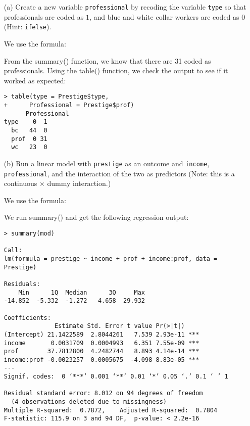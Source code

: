 \documentclass[12pt,letterpaper]{article}
\begin{document}
\newpage
\begin{enumerate}
	
	\item [(a)]
	Create a new variable \texttt{professional} by recoding the variable \texttt{type} so that professionals are coded as $1$, and blue and white collar workers are coded as $0$ (Hint: \texttt{ifelse}).
	
	\vspace{0.6cm}
\noindent We use the formula:
\vspace{.5cm}
  
\vspace{.5cm}   
\noindent From the summary() function, we know that there are 31 coded as professionals. Using the table() function, we check the output to see if it worked as expected:
\begin{verbatim}
> table(type = Prestige$type,
+      Professional = Prestige$prof)
      Professional
type    0  1
  bc   44  0
  prof  0 31
  wc   23  0
\end{verbatim}
	
	\item [(b)]
	Run a linear model with \texttt{prestige} as an outcome and \texttt{income}, \texttt{professional}, and the interaction of the two as predictors (Note: this is a continuous $\times$ dummy interaction.)
	
	\vspace{0.6cm}
\noindent We use the formula:
\vspace{.5cm}
  
\vspace{.5cm}   
\noindent We run summary() and get the following regression output:
\newpage
\begin{verbatim}
> summary(mod)

Call:
lm(formula = prestige ~ income + prof + income:prof, data = Prestige)

Residuals:
    Min      1Q  Median      3Q     Max 
-14.852  -5.332  -1.272   4.658  29.932 

Coefficients:
              Estimate Std. Error t value Pr(>|t|)    
(Intercept) 21.1422589  2.8044261   7.539 2.93e-11 ***
income       0.0031709  0.0004993   6.351 7.55e-09 ***
prof        37.7812800  4.2482744   8.893 4.14e-14 ***
income:prof -0.0023257  0.0005675  -4.098 8.83e-05 ***
---
Signif. codes:  0 ‘***’ 0.001 ‘**’ 0.01 ‘*’ 0.05 ‘.’ 0.1 ‘ ’ 1

Residual standard error: 8.012 on 94 degrees of freedom
  (4 observations deleted due to missingness)
Multiple R-squared:  0.7872,	Adjusted R-squared:  0.7804 
F-statistic: 115.9 on 3 and 94 DF,  p-value: < 2.2e-16
\end{verbatim}


\end{enumerate}
\end{document}
